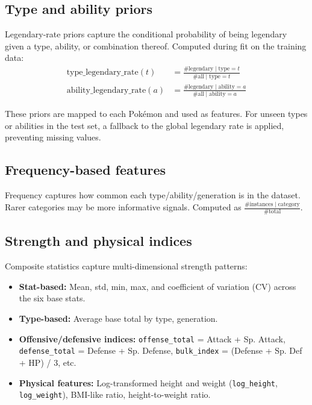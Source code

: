 \subsection{Type and ability priors}

Legendary-rate priors capture the conditional probability of being legendary given a type, ability, or combination thereof. Computed during fit on the training data:
\begin{align*}
  \text{type\_legendary\_rate}(t) &= \frac{\#\text{legendary} \mid \text{type}=t}{\#\text{all} \mid \text{type}=t} \\
  \text{ability\_legendary\_rate}(a) &= \frac{\#\text{legendary} \mid \text{ability}=a}{\#\text{all} \mid \text{ability}=a}
\end{align*}

These priors are mapped to each Pokémon and used as features. For unseen types or abilities in the test set, a fallback to the global legendary rate is applied, preventing missing values.

\subsection{Frequency-based features}

Frequency captures how common each type/ability/generation is in the dataset. Rarer categories may be more informative signals. Computed as $\frac{\#\text{instances} \mid \text{category}}{\#\text{total}}$.

\subsection{Strength and physical indices}

Composite statistics capture multi-dimensional strength patterns:
\begin{itemize}
  \item \textbf{Stat-based:} Mean, std, min, max, and coefficient of variation (CV) across the six base stats.
  \item \textbf{Type-based:} Average base total by type, generation.
  \item \textbf{Offensive/defensive indices:} \texttt{offense\_total} = Attack + Sp. Attack, \texttt{defense\_total} = Defense + Sp. Defense, \texttt{bulk\_index} = (Defense + Sp. Def + HP) / 3, etc.
  \item \textbf{Physical features:} Log-transformed height and weight (\texttt{log\_height}, \texttt{log\_weight}), BMI-like ratio, height-to-weight ratio.
\end{itemize}

